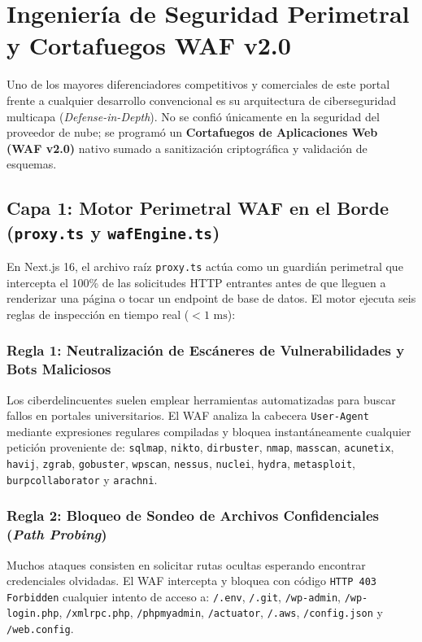 \documentclass[12pt,a4paper,oneside]{report}
\begin{document}
\chapter{Ingeniería de Seguridad Perimetral y Cortafuegos WAF v2.0}

Uno de los mayores diferenciadores competitivos y comerciales de este portal frente a cualquier desarrollo convencional es su arquitectura de ciberseguridad multicapa (\textit{Defense-in-Depth}). No se confió únicamente en la seguridad del proveedor de nube; se programó un \textbf{Cortafuegos de Aplicaciones Web (WAF v2.0)} nativo sumado a sanitización criptográfica y validación de esquemas.

\section{Capa 1: Motor Perimetral WAF en el Borde (\texttt{proxy.ts} y \texttt{wafEngine.ts})}
En Next.js 16, el archivo raíz \texttt{proxy.ts} actúa como un guardián perimetral que intercepta el 100\% de las solicitudes HTTP entrantes antes de que lleguen a renderizar una página o tocar un endpoint de base de datos. El motor ejecuta seis reglas de inspección en tiempo real ($< 1\text{ ms}$):

\subsection{Regla 1: Neutralización de Escáneres de Vulnerabilidades y Bots Maliciosos}
Los ciberdelincuentes suelen emplear herramientas automatizadas para buscar fallos en portales universitarios. El WAF analiza la cabecera \texttt{User-Agent} mediante expresiones regulares compiladas y bloquea instantáneamente cualquier petición proveniente de:
\texttt{sqlmap}, \texttt{nikto}, \texttt{dirbuster}, \texttt{nmap}, \texttt{masscan}, \texttt{acunetix}, \texttt{havij}, \texttt{zgrab}, \texttt{gobuster}, \texttt{wpscan}, \texttt{nessus}, \texttt{nuclei}, \texttt{hydra}, \texttt{metasploit}, \texttt{burpcollaborator} y \texttt{arachni}.

\subsection{Regla 2: Bloqueo de Sondeo de Archivos Confidenciales (\textit{Path Probing})}
Muchos ataques consisten en solicitar rutas ocultas esperando encontrar credenciales olvidadas. El WAF intercepta y bloquea con código \texttt{HTTP 403 Forbidden} cualquier intento de acceso a:
\texttt{/.env}, \texttt{/.git}, \texttt{/wp-admin}, \texttt{/wp-login.php}, \texttt{/xmlrpc.php}, \texttt{/phpmyadmin}, \texttt{/actuator}, \texttt{/.aws}, \texttt{/config.json} y \texttt{/web.config}.
\end{document}
